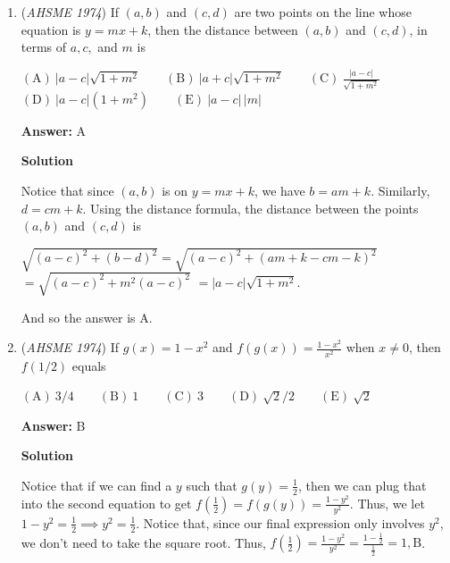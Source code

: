 \begin{enumerate}
\textbf{Solution}

Expanding, we have $2kx^2-8x-x^2+6=0$, or $(2k-1)x^2-8x+6=0$. For this quadratic not to have real roots, it must have a negative discriminant. Therefore, $(-8)^2-4(2k-1)(6)<0\implies 64-48k+24<0\implies k>\frac{11}{6}$. From here, we can easily see that the smallest integral value of $k$ is $2, \boxed{\text{B}}$.

 


	\item (\textit{AHSME 1974}) If $(a, b)$ and $(c, d)$ are two points on the line whose equation is $y=mx+k$, then the distance between $(a, b)$ and $(c, d)$, in terms of $a, c,$ and $m$ is 


 $\mathrm{(A)\ } |a-c|\sqrt{1+m^2} \qquad \mathrm{(B) \ }|a+c|\sqrt{1+m^2} \qquad \mathrm{(C) \  } \frac{|a-c|}{\sqrt{1+m^2}} \qquad$
$\mathrm{(D) \  } |a-c|(1+m^2) \qquad \mathrm{(E) \  }|a-c|\,|m|$

 \textbf{Answer: }A



\textbf{Solution}

Notice that since $(a, b)$ is on $y=mx+k$, we have $b=am+k$. Similarly, $d=cm+k$. Using the distance formula, the distance between the points $(a, b)$ and $(c, d)$ is

 $\sqrt{(a-c)^2+(b-d)^2}=\sqrt{(a-c)^2+(am+k-cm-k)^2}$
$=\sqrt{(a-c)^2+m^2(a-c)^2}$
$=|a-c|\sqrt{1+m^2}.$

 And so the answer is $\boxed{\text{A}}$.

 


	\item (\textit{AHSME 1974}) If $g(x)=1-x^2$ and $f(g(x))=\frac{1-x^2}{x^2}$ when $x\not=0$, then $f(1/2)$ equals 


 $\mathrm{(A)\ } 3/4 \qquad \mathrm{(B) \ }1 \qquad \mathrm{(C) \  } 3 \qquad \mathrm{(D) \  } \sqrt{2}/2 \qquad \mathrm{(E) \  }\sqrt{2}$

 \textbf{Answer: }B



\textbf{Solution}

Notice that if we can find a $y$ such that $g(y)=\frac{1}{2}$, then we can plug that into the second equation to get $f\left(\frac{1}{2}\right)=f(g(y))=\frac{1-y^2}{y^2}$. Thus, we let $1-y^2=\frac{1}{2}\implies y^2=\frac{1}{2}$. Notice that, since our final expression only involves $y^2$, we don't need to take the square root. Thus, $f\left(\frac{1}{2}\right)=\frac{1-y^2}{y^2}=\frac{1-\frac{1}{2}}{\frac{1}{2}}=1, \boxed{\text{B}}$.


\end{enumerate}
